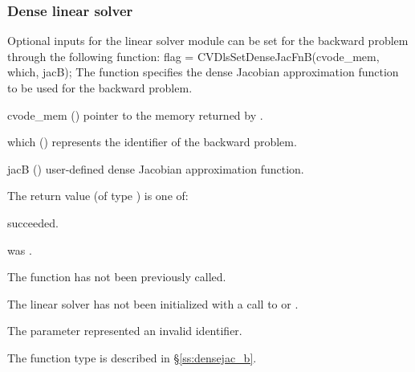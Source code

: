 
\subsubsection{Dense linear solver}
Optional inputs for the {\cvdense} linear solver module can be set for the backward
problem through the following function:
{
  flag = CVDlsSetDenseJacFnB(cvode\_mem, which, jacB);
}
{
  The function  specifies the dense Jacobian
  approximation function to be used for the backward problem.
}
{
  \begin{args}
  \item[cvode\_mem] ()
    pointer to the {\cvodes} memory returned by .
  \item[which] ()
    represents the identifier of the backward problem.
  \item[jacB] ()
    user-defined dense Jacobian approximation function.
  \end{args}
}
{
  The return value  (of type ) is one of:
  \begin{args}
  \item[\Id{CVDLS\_SUCCESS}] 
     succeeded.
  \item[\Id{CVDLS\_MEM\_NULL}]
     was .
  \item[\Id{CVDLS\_NO\_ADJ}]
    The function  has not been previously called.
  \item[\Id{CVDLS\_LMEM\_NULL}]
    The linear solver has not been initialized with a call to 
    or .
  \item[\Id{CVDLS\_ILL\_INPUT}]
    The parameter  represented an invalid identifier.
  \end{args}
}
{
  The function type  is described in \S\ref{ss:densejac_b}.
}


